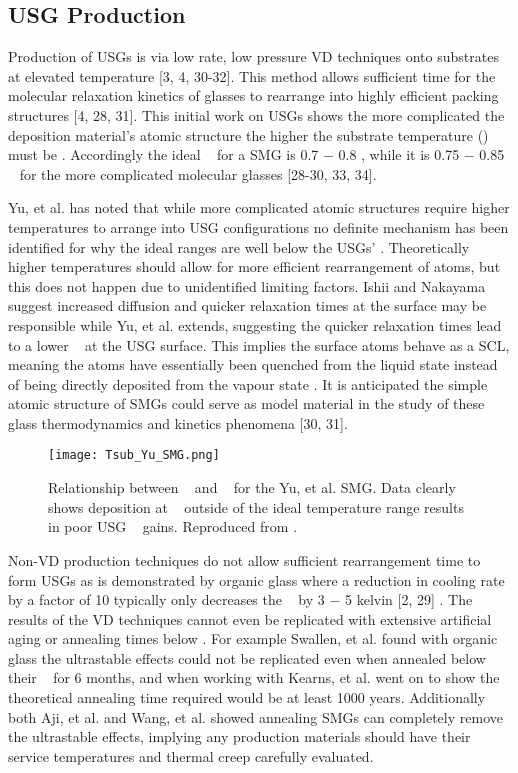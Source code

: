 \documentclass[a4paper,12pt,oneside]{report}%
\begin{document}
\subsection{USG Production}
Production of USGs is via low rate, low pressure VD techniques onto substrates at elevated temperature [3, 4, 30-32]. This method allows sufficient time for the molecular relaxation kinetics of glasses to rearrange into highly efficient packing structures [4, 28, 31]. This initial work on USGs shows the more complicated the deposition material's atomic structure the higher the substrate temperature (\Tsub) must be \cite{Yu2013}. Accordingly the ideal \Tsub~ for a SMG is 0.7 $-$ 0.8 \Tg, while it is 0.75 $-$ 0.85 \Tg~ for the more complicated molecular glasses [28-30, 33, 34].
 
Yu, et al. \cite{Yu2013} has noted that while more complicated atomic structures require higher temperatures to arrange into USG configurations no definite mechanism has been identified for why the ideal ranges are well below the USGs' \Tg. Theoretically higher temperatures should allow for more efficient rearrangement of atoms, but this does not happen due to unidentified limiting factors. Ishii and Nakayama \cite{Ishii2014} suggest increased diffusion and quicker relaxation times at the surface may be responsible while Yu, et al. \cite{Yu2013} extends, suggesting the quicker relaxation times lead to a lower \Tg~ at the USG surface. This implies the surface atoms behave as a SCL, meaning the atoms have essentially been quenched from the liquid state instead of being directly deposited from the vapour state \cite{Yu2013}. It is anticipated the simple atomic structure of SMGs could serve as model material in the study of these glass thermodynamics and kinetics phenomena [30, 31]. 

\begin{figure}[htbp]
	\centering
	\texttt{[image: Tsub\_Yu\_SMG.png]}
	\caption{Relationship between \Tsub~ and \dTg~ for the Yu, et al. \cite{Yu2013} SMG. Data clearly shows deposition at  \Tsub~ outside of the ideal temperature range results in poor USG \dTg~ gains. Reproduced from \cite{Yu2013}.}
	\label{fig:YuTsub}
\end{figure}

Non-VD production techniques do not allow sufficient rearrangement time to form USGs as is demonstrated by organic glass where a reduction in cooling rate by a factor of 10 typically only decreases the \Tg~ by 3 $-$ 5 kelvin [2, 29] . The results of the VD techniques cannot even be replicated with extensive artificial aging or annealing times below \Tg. For example Swallen, et al. \cite{Swallen2007} found with organic  glass the ultrastable effects could not be replicated even when annealed below their  \Tg~ for 6 months, and when working with Kearns, et al. \cite{Kearns2008} went on to show the theoretical annealing time required would be at least 1000 years. Additionally both Aji, et al. \cite{Aji2013} and Wang, et al. \cite{Wang2014} showed annealing SMGs can completely remove the ultrastable effects, implying any production materials should have their service temperatures and thermal creep carefully evaluated.
\end{document}
